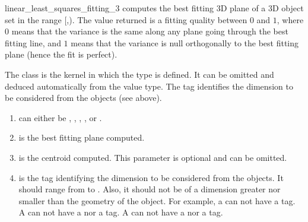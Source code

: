 \begin{ccRefFunction}{linear_least_squares_fitting_3}
{ computes the best fitting 3D plane of a 3D object set in the range
[,). The value returned is a fitting quality
between $0$ and $1$, where $0$ means that the variance is the same
along any plane going through the best fitting line, and $1$ means that the variance is null orthogonally to the best fitting plane (hence the fit is perfect). }

The class  is the kernel in which the type  is defined. It can be omitted and deduced automatically from the value type. The tag  identifies the dimension to be considered from the objects (see above).


\begin{enumerate}
   \item  {} can either be ,
          , , ,
           or .
   \item  {} is the best fitting plane computed.
   \item  {} is the centroid computed. This parameter is optional and can be omitted.
   \item  {} is the tag identifying the dimension to be considered from the objects. It should range from  to . Also, it should not be of a dimension greater nor smaller than the geometry of the object. For example, a  can not have a  tag. A  can not have a  nor a  tag. A  can not have a  nor a  tag.
\end{enumerate}

\end{ccRefFunction}
